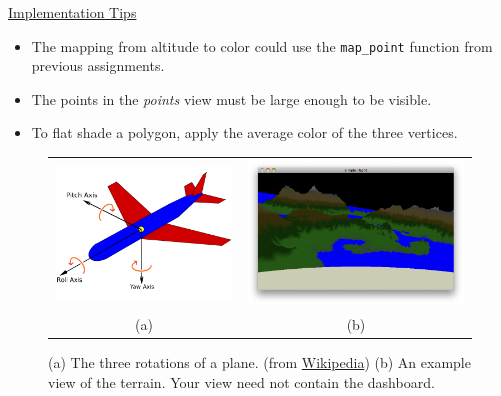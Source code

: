\documentclass[addpoints]{exam}
\begin{document}
\begin{questions}
    \noindent\underline{Implementation Tips}
    \begin{itemize}
    \item The mapping from altitude to color could use the \texttt{map\_point} function from previous assignments.
    \item The points in the \textit{points} view must be large enough to be visible.
    \item To flat shade a polygon, apply the average color of the three vertices.
    \end{itemize}


    \begin{figure}[!h]
    \centering
    \begin{tabular}{cc}
      \includegraphics[height=.35\textwidth]{plane}
      &   \includegraphics[height=.35\textwidth]{view}\\
      (a) & (b)
    \end{tabular}
    \caption{(a) The three rotations of a plane. (from \href{https://en.wikipedia.org/wiki/Flight_dynamics_(fixed-wing_aircraft}{Wikipedia}) (b) An example view of the terrain. Your view need not contain the dashboard.}
    \label{fig:rotate}    
  \end{figure}


\end{questions}
\end{document}
